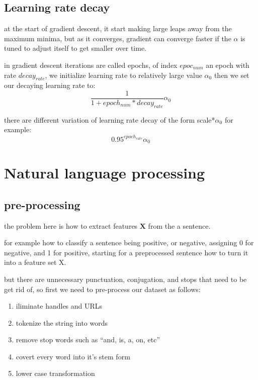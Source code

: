 \documentclass[4apaper,12pt]{book}
\begin{document}
\section{Learning rate decay}
\begin{description}
\item at the start of gradient descent, it start making large leaps away from the maximum minima, but as it converges, gradient can converge faster if the $\alpha$ is tuned to adjust itself to get smaller over time.
\item in  gradient descent iterations are called epochs, of index $epoc_{num}$ an epoch with rate $decay_{rate}$, we initialize learning rate to relatively large value $\alpha_0$ then we set our decaying learning rate to: $$\frac{1}{1+epoch_{num}*decay_{rate}}\alpha_0$$
\item there are different variation of learning rate decay of the form scale*$\alpha_0$ for example:
  $$0.95^{epoch_{rate}}\alpha_0 $$

\end{description}

\chapter{Natural language processing}
\section{pre-processing}
\begin{description}
\item the problem here is how to extract features $\mathbf{X}$ from the a sentence.
\item for example how to classify a sentence being positive, or negative, assigning 0 for negative, and 1 for positive, starting for a preprocessed sentence how to turn it into a feature set X.
  \item but there are unnecessary punctuation, conjugation, and stops that need to be get rid of, so first we need to pre-process our dataset as follows:
  \begin{enumerate}
  \item iliminate handles and URLs
  \item tokenize the string into words
  \item remove stop words such as ``and, is, a, on, etc''
  \item covert every word into it's stem form
  \item lower case transformation
  \end{enumerate}

\end{description}
\end{document}

